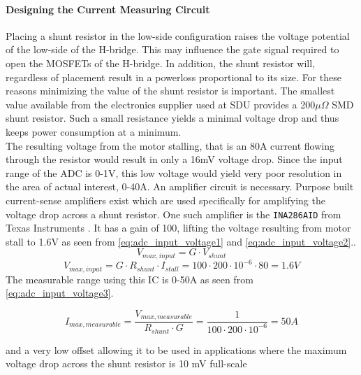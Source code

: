 
\paragraph{Designing the Current Measuring Circuit} %
\label{par:designing_the_current_measuring_circuit}

Placing a shunt resistor in the low-side configuration raises the voltage potential of the low-side of the H-bridge.
This may influence the gate signal required to open the MOSFETs of the H-bridge.
In addition, the shunt resistor will, regardless of placement result in a powerloss proportional to its size.
For these reasons minimizing the value of the shunt resistor is important. 
The smallest value available from the electronics supplier used at SDU provides a 200$\mu\Omega$ SMD shunt resistor.
Such a small resistance yields a minimal voltage drop and thus keeps power consumption at a minimum.\\
The resulting voltage from the motor stalling, that is an 80A current flowing through the resistor would result in only a 16mV voltage drop.
Since the input range of the ADC is 0-1V, this low voltage would yield very poor resolution in the area of actual interest, 0-40A.
An amplifier circuit is necessary.
Purpose built current-sense amplifiers exist which are used specifically for amplifying the voltage drop across a shunt resistor.
One such amplifier is the \texttt{INA286AID} from Texas Instruments \cite{INA286AID}.
It has a gain of 100, lifting the voltage resulting from motor stall to 1.6V as seen from \ref{eq:adc_input_voltage1} and \ref{eq:adc_input_voltage2}..
\begin{equation}
	V_{max,input} = G \cdot V_{shunt}
	\label{eq:adc_input_voltage1}
\end{equation}
\begin{equation}
	V_{max,input} = G \cdot R_{shunt} \cdot I_{stall} = 100 \cdot 200\cdot10^{-6} \cdot 80 = 1.6V
	\label{eq:adc_input_voltage2}
\end{equation}
The measurable range using this IC is 0-50A as seen from \ref{eq:adc_input_voltage3}.

\begin{equation}
	I_{max, measurable} = \frac{V_{max, measurable}}{R_{shunt}\cdot G} = \frac{1}{100 \cdot 200\cdot10^{-6} } = 50A
	\label{eq:adc_input_voltage3}
\end{equation}

and a very low offset allowing it to be used in applications where the maximum voltage drop across the shunt resistor is 10 mV full-scale 

